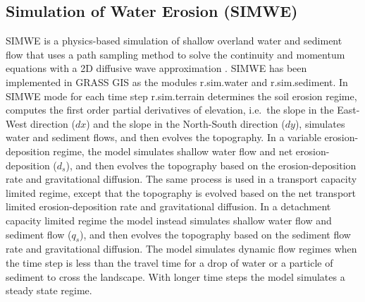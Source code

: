 \documentclass[gmd, manuscript]{copernicus}
\begin{document}
\subsection{Simulation of Water Erosion (SIMWE)} \label{simwe}
SIMWE is a physics-based simulation 
of shallow overland water and sediment flow
that uses a path sampling method to solve the continuity and momentum equations 
with a 2D diffusive wave approximation 
\citep{Mitas1998,Mitasova2004}.
SIMWE has been implemented in GRASS GIS as the modules 
r.sim.water
and r.sim.sediment. %
In SIMWE mode 
for each time step
r.sim.terrain
determines the soil erosion regime,
computes the first order partial derivatives of elevation,
i.e.~the slope in the East-West direction ($dx$)
and the slope in the North-South direction ($dy$),
simulates water and sediment flows, 
and then evolves the topography. 
%
% 
% 
In a variable erosion-deposition regime,
the model simulates shallow water flow and net erosion-deposition ($d_s$),
and then evolves the topography based on the erosion-deposition rate
and gravitational diffusion.
The same process is used in
a transport capacity limited regime,
except that the topography is evolved based on 
the net transport limited erosion-deposition rate
and gravitational diffusion.
In a detachment capacity limited regime
the model instead simulates shallow water flow and sediment flow ($q_s$),
and then evolves the topography based on the sediment flow rate
and gravitational diffusion.
The model simulates dynamic flow regimes
when the time step is less than the travel time 
for a drop of water or a particle of sediment to cross the landscape.
With longer time steps the model simulates a steady state regime. 

%
% 

%
% 
% 
%
%
\end{document}
